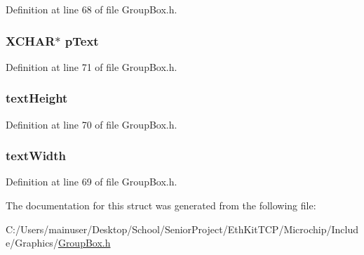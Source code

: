 Definition at line 68 of file Group\+Box.\+h.

\hypertarget{struct_g_r_o_u_p_b_o_x_a934b5563cdaf14803728ff3a7b7e8c7f}{}
\subsubsection[{p\+Text}]{\setlength{\rightskip}{0pt plus 5cm}X\+C\+H\+A\+R$\ast$ p\+Text}\label{struct_g_r_o_u_p_b_o_x_a934b5563cdaf14803728ff3a7b7e8c7f}


Definition at line 71 of file Group\+Box.\+h.

\hypertarget{struct_g_r_o_u_p_b_o_x_a40fa9c35391b0005032180b85e7afd34}{}
\subsubsection[{text\+Height}]{ text\+Height}\label{struct_g_r_o_u_p_b_o_x_a40fa9c35391b0005032180b85e7afd34}


Definition at line 70 of file Group\+Box.\+h.

\hypertarget{struct_g_r_o_u_p_b_o_x_a9fbde8f74d930599fd9206a263e46cd6}{}
\subsubsection[{text\+Width}]{ text\+Width}\label{struct_g_r_o_u_p_b_o_x_a9fbde8f74d930599fd9206a263e46cd6}


Definition at line 69 of file Group\+Box.\+h.



The documentation for this struct was generated from the following file\+:\begin{DoxyCompactItemize}
\item 
C\+:/\+Users/mainuser/\+Desktop/\+School/\+Senior\+Project/\+Eth\+Kit\+T\+C\+P/\+Microchip/\+Include/\+Graphics/\hyperlink{_group_box_8h}{Group\+Box.\+h}\end{DoxyCompactItemize}
